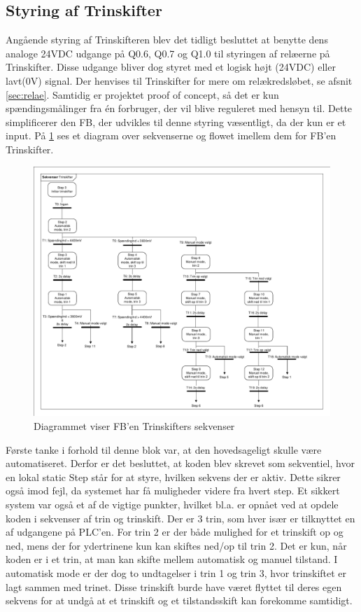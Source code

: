 \subsection{Styring af Trinskifter}

Angående styring af Trinskifteren blev det tidligt besluttet at benytte dens analoge 24VDC udgange på Q0.6, Q0.7 og Q1.0 til styringen af relæerne på Trinskifter. Disse udgange bliver dog styret med et logisk højt (24VDC) eller lavt(0V) signal. Der henvises til Trinskifter for mere om relækredsløbet, se afsnit \ref{sec:relae}.
Samtidig er projektet proof of concept, så det er kun spændingsmålinger fra én forbruger, der vil blive reguleret med hensyn til. Dette simplificerer den FB, der udvikles til denne styring væsentligt, da der kun er et input. På \ref{fig:GraphTrinskifterPLC} ses et diagram over sekvenserne og flowet imellem dem for FB'en Trinskifter.

\begin{figure}[H] %
	\centering
	\includegraphics[width=1\textwidth]{Figure/GraphTrinskifterPLC}
	\caption{Diagrammet viser FB'en Trinskifters sekvenser}
	\label{fig:GraphTrinskifterPLC}
\end{figure}

Første tanke i forhold til denne blok var, at den hovedsageligt skulle være automatiseret. Derfor er det besluttet, at koden blev skrevet som sekventiel, hvor en lokal static Step står for at styre, hvilken sekvens der er aktiv. Dette sikrer også imod fejl, da systemet har få muligheder videre fra hvert step. Et sikkert system var også et af de vigtige punkter, hvilket bl.a. er opnået ved at opdele koden i sekvenser af trin og trinskift. Der er 3 trin, som hver især er tilknyttet en af udgangene på PLC'en. For trin 2 er der både mulighed for et trinskift op og ned, mens der for ydertrinene kun kan skiftes ned/op til trin 2. Det er kun, når koden er i et trin, at man kan skifte mellem automatisk og manuel tilstand. I automatisk mode er der dog to undtagelser i trin 1 og trin 3, hvor trinskiftet er lagt sammen med trinet. Disse trinskift burde have været flyttet til deres egen sekvens for at undgå at et trinskift og et tilstandsskift kan forekomme samtidigt.


